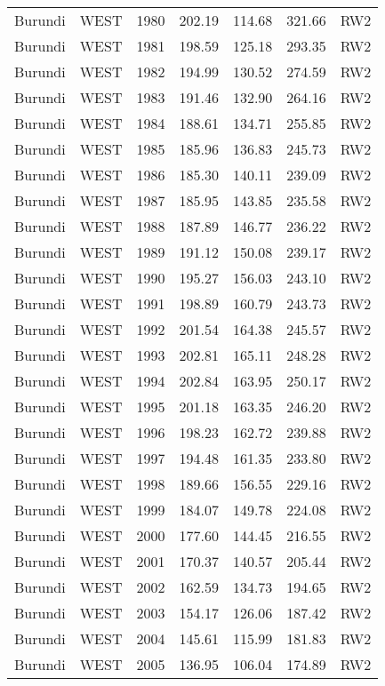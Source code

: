 \begin{longtable}{lllrrrl}
  Burundi & WEST & 1980 & 202.19 & 114.68 & 321.66 & RW2 \\ 
  Burundi & WEST & 1981 & 198.59 & 125.18 & 293.35 & RW2 \\ 
  Burundi & WEST & 1982 & 194.99 & 130.52 & 274.59 & RW2 \\ 
  Burundi & WEST & 1983 & 191.46 & 132.90 & 264.16 & RW2 \\ 
  Burundi & WEST & 1984 & 188.61 & 134.71 & 255.85 & RW2 \\ 
  Burundi & WEST & 1985 & 185.96 & 136.83 & 245.73 & RW2 \\ 
  Burundi & WEST & 1986 & 185.30 & 140.11 & 239.09 & RW2 \\ 
  Burundi & WEST & 1987 & 185.95 & 143.85 & 235.58 & RW2 \\ 
  Burundi & WEST & 1988 & 187.89 & 146.77 & 236.22 & RW2 \\ 
  Burundi & WEST & 1989 & 191.12 & 150.08 & 239.17 & RW2 \\ 
  Burundi & WEST & 1990 & 195.27 & 156.03 & 243.10 & RW2 \\ 
  Burundi & WEST & 1991 & 198.89 & 160.79 & 243.73 & RW2 \\ 
  Burundi & WEST & 1992 & 201.54 & 164.38 & 245.57 & RW2 \\ 
  Burundi & WEST & 1993 & 202.81 & 165.11 & 248.28 & RW2 \\ 
  Burundi & WEST & 1994 & 202.84 & 163.95 & 250.17 & RW2 \\ 
  Burundi & WEST & 1995 & 201.18 & 163.35 & 246.20 & RW2 \\ 
  Burundi & WEST & 1996 & 198.23 & 162.72 & 239.88 & RW2 \\ 
  Burundi & WEST & 1997 & 194.48 & 161.35 & 233.80 & RW2 \\ 
  Burundi & WEST & 1998 & 189.66 & 156.55 & 229.16 & RW2 \\ 
  Burundi & WEST & 1999 & 184.07 & 149.78 & 224.08 & RW2 \\ 
  Burundi & WEST & 2000 & 177.60 & 144.45 & 216.55 & RW2 \\ 
  Burundi & WEST & 2001 & 170.37 & 140.57 & 205.44 & RW2 \\ 
  Burundi & WEST & 2002 & 162.59 & 134.73 & 194.65 & RW2 \\ 
  Burundi & WEST & 2003 & 154.17 & 126.06 & 187.42 & RW2 \\ 
  Burundi & WEST & 2004 & 145.61 & 115.99 & 181.83 & RW2 \\ 
  Burundi & WEST & 2005 & 136.95 & 106.04 & 174.89 & RW2 \\ 

\end{longtable}
